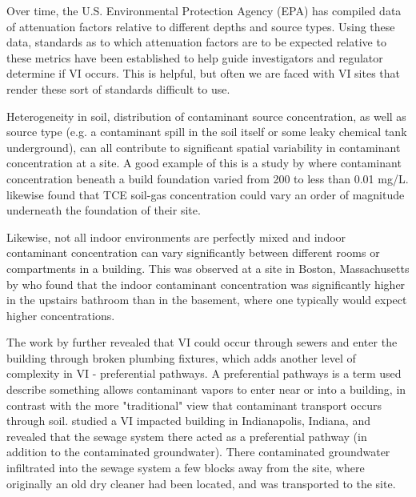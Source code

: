 Over time, the U.S. Environmental Protection Agency (EPA) has compiled data of attenuation factors relative to different depths and source types.
Using these data, standards as to which attenuation factors are to be expected relative to these metrics have been established to help guide investigators and regulator determine if VI occurs.
This is helpful, but often we are faced with VI sites that render these sort of standards difficult to use.\par

Heterogeneity in soil, distribution of contaminant source concentration, as well as source type (e.g. a contaminant spill in the soil itself or some leaky chemical tank underground), can all contribute to significant spatial variability in contaminant concentration at a site.
A good example of this is a study by \citeauthor{luo_spatial_2009}\cite{luo_spatial_2009} where contaminant concentration beneath a build foundation varied from 200 to less than 0.01 mg/L.
\citeauthor{bekele_influence_2014}\cite{bekele_influence_2014} likewise found that TCE soil-gas concentration could vary an order of magnitude underneath the foundation of their site.\par

Likewise, not all indoor environments are perfectly mixed and indoor contaminant concentration can vary significantly between different rooms or compartments in a building.
This was observed at a site in Boston, Massachusetts by \citeauthor{pennell_sewer_2013}\cite{pennell_sewer_2013} who found that the indoor contaminant concentration was significantly higher in the upstairs bathroom than in the basement, where one typically would expect higher concentrations.\par

The work by \citeauthor{pennell_sewer_2013}\cite{pennell_sewer_2013} further revealed that VI could occur through sewers and enter the building through broken plumbing fixtures, which adds another level of complexity in VI - preferential pathways.
A preferential pathways is a term used describe something allows contaminant vapors to enter near or into a building, in contrast with the more "traditional" view that contaminant transport occurs through soil.
\citeauthor{mchugh_evidence_2017}\cite{mchugh_evidence_2017} studied a VI impacted building in Indianapolis, Indiana, and revealed that the sewage system there acted as a preferential pathway (in addition to the contaminated groundwater).
There contaminated groundwater infiltrated into the sewage system a few blocks away from the site, where originally an old dry cleaner had been located, and was transported to the site.\par

